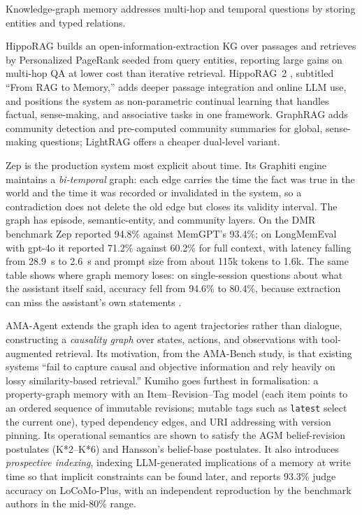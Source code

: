 \documentclass[11pt]{article}
\begin{document}
Knowledge-graph memory addresses multi-hop and temporal questions by storing entities and typed relations.

HippoRAG \citep{gutierrez2024hipporag} builds an open-information-extraction KG over passages and retrieves by Personalized PageRank seeded from query entities, reporting large gains on multi-hop QA at lower cost than iterative retrieval. HippoRAG~2 \citep{gutierrez2025hipporag2}, subtitled ``From RAG to Memory,'' adds deeper passage integration and online LLM use, and positions the system as non-parametric continual learning that handles factual, sense-making, and associative tasks in one framework. GraphRAG \citep{edge2024graphrag} adds community detection and pre-computed community summaries for global, sense-making questions; LightRAG \citep{guo2024lightrag} offers a cheaper dual-level variant.

Zep \citep{rasmussen2025zep} is the production system most explicit about time. Its Graphiti engine maintains a \emph{bi-temporal} graph: each edge carries the time the fact was true in the world and the time it was recorded or invalidated in the system, so a contradiction does not delete the old edge but closes its validity interval. The graph has episode, semantic-entity, and community layers. On the DMR benchmark Zep reported 94.8\% against MemGPT's 93.4\%; on LongMemEval with gpt-4o it reported 71.2\% against 60.2\% for full context, with latency falling from 28.9~s to 2.6~s and prompt size from about 115k tokens to 1.6k. The same table shows where graph memory loses: on single-session questions about what the assistant itself said, accuracy fell from 94.6\% to 80.4\%, because extraction can miss the assistant's own statements \citep{rasmussen2025zep,kumar2026agentmemory}.

AMA-Agent \citep{zhao2026amabench} extends the graph idea to agent trajectories rather than dialogue, constructing a \emph{causality graph} over states, actions, and observations with tool-augmented retrieval. Its motivation, from the AMA-Bench study, is that existing systems ``fail to capture causal and objective information and rely heavily on lossy similarity-based retrieval.'' Kumiho \citep{park2026kumiho} goes furthest in formalisation: a property-graph memory with an Item--Revision--Tag model (each item points to an ordered sequence of immutable revisions; mutable tags such as \texttt{latest} select the current one), typed dependency edges, and URI addressing with version pinning. Its operational semantics are shown to satisfy the AGM belief-revision postulates (K*2--K*6) and Hansson's belief-base postulates. It also introduces \emph{prospective indexing}, indexing LLM-generated implications of a memory at write time so that implicit constraints can be found later, and reports 93.3\% judge accuracy on LoCoMo-Plus, with an independent reproduction by the benchmark authors in the mid-80\% range.
\end{document}
